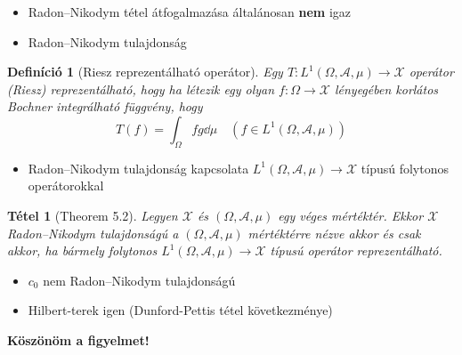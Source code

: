 \documentclass{beamer} %
\newtheorem{theo}[lem]{Tétel}
\newtheorem{defi}[lem]{Definíció}
\begin{document}
\begin{frame}
\justifying
\begin{itemize}
\item Radon\---Nikodym tétel átfogalmazása általánosan \textbf{nem} igaz
\pause \item Radon\---Nikodym tulajdonság
\end{itemize}
\pause \begin{defi}[Riesz reprezentálható operátor] Egy $T \colon L^1(\Omega, \mathcal{A}, \mu) \to \mathcal{X}$ operátor (Riesz) reprezentálható, hogy ha létezik egy olyan $f\colon \Omega \to \mathcal{X}$ lényegében korlátos Bochner integrálható függvény, hogy
$$T(f) = \int_{\Omega} fg \dd{\mu} \quad(f \in L^1(\Omega, \mathcal{A}, \mu))$$
\end{defi}
\begin{itemize}
\pause \item Radon\---Nikodym tulajdonság kapcsolata $L^1(\Omega, \mathcal{A}, \mu) \to \mathcal{X}$ típusú folytonos operátorokkal
\end{itemize}
\end{frame}
\begin{frame}
\justifying
\begin{theo}[Theorem 5.2] Legyen $\mathcal{X}$ és $(\Omega, \mathcal{A}, \mu)$ egy véges mértéktér. Ekkor $\mathcal{X}$ Radon\---Nikodym tulajdonságú a $(\Omega, \mathcal{A}, \mu)$ mértéktérre nézve akkor és csak akkor, ha bármely folytonos $L^1(\Omega, \mathcal{A}, \mu) \to \mathcal{X}$ típusú operátor reprezentálható.
\end{theo}
\begin{itemize}
\pause \item $c_0$ nem Radon\---Nikodym tulajdonságú
\pause \item Hilbert-terek igen (Dunford-Pettis tétel következménye)
\end{itemize}
\end{frame}
\begin{frame}
\center
\textbf{Köszönöm a figyelmet!}
\end{frame}
\end{document}
